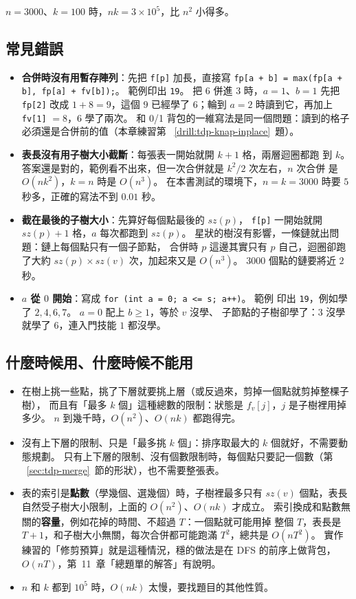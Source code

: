 $n = 3000$、$k = 100$ 時，$nk = 3 \times 10^5$，比 $n^2$ 小得多。

\subsection{常見錯誤}

\begin{itemize}
\item \textbf{合併時沒有用暫存陣列}：先把 \texttt{f[p]} 加長，直接寫
\texttt{fp[a + b] = max(fp[a + b], fp[a] + fv[b]);}。 範例印出 \texttt{19}。 把
$6$ 併進 $3$ 時，$a = 1$、$b = 1$ 先把 \texttt{fp[2]} 改成 $1 + 8 = 9$，這個 $9$
已經學了 $6$；輪到 $a = 2$ 時讀到它，再加上 \texttt{fv[1]} $= 8$，$6$ 學了兩次。
和 0/1 背包的一維寫法是同一個問題：讀到的格子必須還是合併前的值（本章練習第
~\ref{drill:tdp-knap-inplace}~題）。
\item \textbf{表長沒有用子樹大小截斷}：每張表一開始就開 $k + 1$ 格，兩層迴圈都跑
到 $k$。 答案還是對的，範例看不出來，但一次合併就是 $k^2 / 2$ 次左右，$n$ 次合併
是 $O(nk^2)$，$k = n$ 時是 $O(n^3)$。 在本書測試的環境下，$n = k = 3000$ 時要
$5$ 秒多，正確的寫法不到 $0.01$ 秒。
\item \textbf{截在最後的子樹大小}：先算好每個點最後的 $\mathit{sz}(p)$，
\texttt{f[p]} 一開始就開 $\mathit{sz}(p) + 1$ 格，$a$ 每次都跑到
$\mathit{sz}(p)$。 星狀的樹沒有影響，一條鏈就出問題：鏈上每個點只有一個子節點，
合併時 $p$ 這邊其實只有 $p$ 自己，迴圈卻跑了大約 $\mathit{sz}(p) \times
\mathit{sz}(v)$ 次，加起來又是 $O(n^3)$。 $3000$ 個點的鏈要將近 $2$ 秒。
\item \textbf{$a$ 從 $0$ 開始}：寫成 \texttt{for (int a = 0; a <= s; a++)}。 範例
印出 \texttt{19}，例如學了 $2, 4, 6, 7$。 $a = 0$ 配上 $b \ge 1$，等於 $v$ 沒學、
子節點的子樹卻學了：$3$ 沒學就學了 $6$，連入門技能 $1$ 都沒學。
\end{itemize}

\subsection{什麼時候用、什麼時候不能用}

\begin{itemize}
\item 在樹上挑一些點，挑了下層就要挑上層（或反過來，剪掉一個點就剪掉整棵子樹），
而且有「最多 $k$ 個」這種總數的限制：狀態是 $f_v[j]$，$j$ 是子樹裡用掉多少。 $n$
到幾千時，$O(n^2)$、$O(nk)$ 都跑得完。
\item 沒有上下層的限制、只是「最多挑 $k$ 個」：排序取最大的 $k$ 個就好，不需要動
態規劃。 只有上下層的限制、沒有個數限制時，每個點只要記一個數（第
~\ref{sec:tdp-merge}~節的形狀），也不需要整張表。
\item 表的索引是\textbf{點數}（學幾個、選幾個）時，子樹裡最多只有
$\mathit{sz}(v)$ 個點，表長自然受子樹大小限制，上面的 $O(n^2)$、$O(nk)$ 才成立。
索引換成和點數無關的\textbf{容量}，例如花掉的時間、不超過 $T$：一個點就可能用掉
整個 $T$，表長是 $T + 1$，和子樹大小無關，每次合併都可能跑滿 $T^2$，總共是
$O(nT^2)$。 實作練習的「修剪預算」就是這種情況，穩的做法是在 DFS 的前序上做背包，
$O(nT)$，第~11~章「總題單的解答」有說明。
\item $n$ 和 $k$ 都到 $10^5$ 時，$O(nk)$ 太慢，要找題目的其他性質。
\end{itemize}

